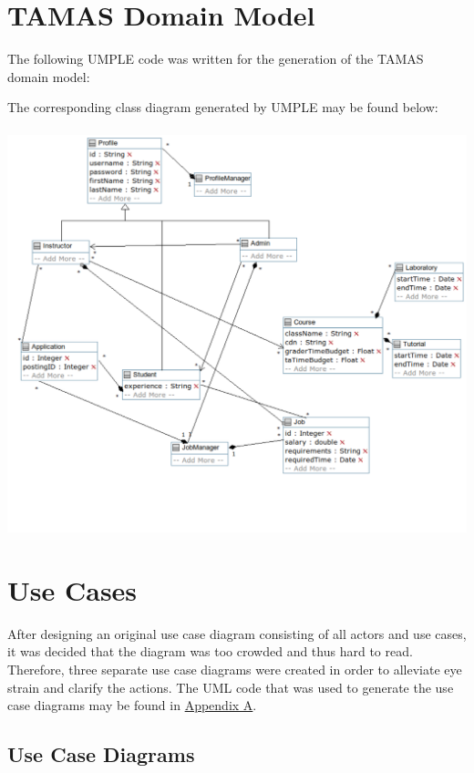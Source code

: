 \documentclass[12pt,openany]{report}
\begin{document}
\chapter{TAMAS Domain Model}
The following UMPLE code was written for the generation of the TAMAS domain model:

The corresponding class diagram generated by UMPLE may be found below:\\\\
\includegraphics[scale=0.6]{model/Diagrams/classdiagram}

\chapter{Use Cases}
After designing an original use case diagram consisting of all actors and use cases, it was decided
that the diagram was too crowded and thus hard to read. Therefore, three separate use case diagrams
were created in order to alleviate eye strain and clarify the actions. The UML code that was used to
generate the use case diagrams may be found in \hyperref[appA]{Appendix A}.
\section{Use Case Diagrams}
\end{document}
